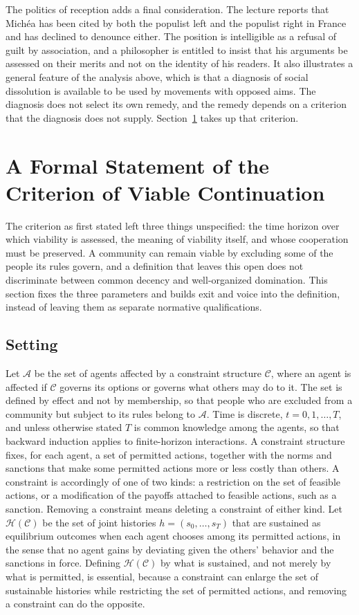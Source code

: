 \documentclass[12pt]{article}
\begin{document}
The politics of reception adds a final consideration. The lecture reports that Michéa has been cited by both the populist left and the populist right in France and has declined to denounce either. The position is intelligible as a refusal of guilt by association, and a philosopher is entitled to insist that his arguments be assessed on their merits and not on the identity of his readers. It also illustrates a general feature of the analysis above, which is that a diagnosis of social dissolution is available to be used by movements with opposed aims. The diagnosis does not select its own remedy, and the remedy depends on a criterion that the diagnosis does not supply. Section~\ref{sec:criterion} takes up that criterion.

\section{A Formal Statement of the Criterion of Viable Continuation}
\label{sec:criterion}

The criterion as first stated left three things unspecified: the time horizon over which viability is assessed, the meaning of viability itself, and whose cooperation must be preserved. A community can remain viable by excluding some of the people its rules govern, and a definition that leaves this open does not discriminate between common decency and well-organized domination. This section fixes the three parameters and builds exit and voice into the definition, instead of leaving them as separate normative qualifications.

\subsection{Setting}

Let $\mathcal A$ be the set of agents affected by a constraint structure $\mathcal C$, where an agent is affected if $\mathcal C$ governs its options or governs what others may do to it. The set is defined by effect and not by membership, so that people who are excluded from a community but subject to its rules belong to $\mathcal A$. Time is discrete, $t=0,1,\dots,T$, and unless otherwise stated $T$ is common knowledge among the agents, so that backward induction applies to finite-horizon interactions. A constraint structure fixes, for each agent, a set of permitted actions, together with the norms and sanctions that make some permitted actions more or less costly than others. A constraint is accordingly of one of two kinds: a restriction on the set of feasible actions, or a modification of the payoffs attached to feasible actions, such as a sanction. Removing a constraint means deleting a constraint of either kind. Let $\mathcal H(\mathcal C)$ be the set of joint histories $h=(s_0,\dots,s_T)$ that are sustained as equilibrium outcomes when each agent chooses among its permitted actions, in the sense that no agent gains by deviating given the others' behavior and the sanctions in force. Defining $\mathcal H(\mathcal C)$ by what is sustained, and not merely by what is permitted, is essential, because a constraint can enlarge the set of sustainable histories while restricting the set of permitted actions, and removing a constraint can do the opposite.
\end{document}
